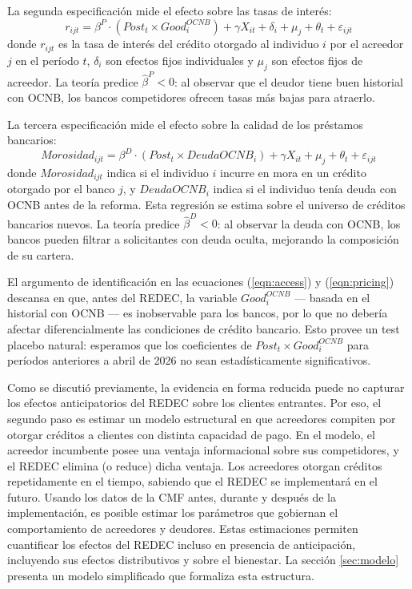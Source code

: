 \documentclass[11pt]{article}
\theoremstyle{plain}
\theoremstyle{plain}
\begin{document}
La segunda especificación mide el efecto sobre las tasas de interés:
\begin{equation}
    r_{ijt} = \beta^P \cdot (Post_t \times Good_i^{OCNB}) + \gamma X_{it} + \delta_i + \mu_j + \theta_t + \varepsilon_{ijt}
    \label{eqn:pricing}
\end{equation}
donde $r_{ijt}$ es la tasa de interés del crédito otorgado al individuo $i$ por el acreedor $j$ en el período $t$, $\delta_i$ son efectos fijos individuales y $\mu_j$ son efectos fijos de acreedor. La teoría predice $\hat{\beta}^P < 0$: al observar que el deudor tiene buen historial con OCNB, los bancos competidores ofrecen tasas más bajas para atraerlo.

La tercera especificación mide el efecto sobre la calidad de los préstamos bancarios:
\begin{equation}
    Morosidad_{ijt} = \beta^D \cdot (Post_t \times DeudaOCNB_i) + \gamma X_{it} + \mu_j + \theta_t + \varepsilon_{ijt}
    \label{eqn:delinquency}
\end{equation}
donde $Morosidad_{ijt}$ indica si el individuo $i$ incurre en mora en un crédito otorgado por el banco $j$, y $DeudaOCNB_i$ indica si el individuo tenía deuda con OCNB antes de la reforma. Esta regresión se estima sobre el universo de créditos bancarios nuevos. La teoría predice $\hat{\beta}^D < 0$: al observar la deuda con OCNB, los bancos pueden filtrar a solicitantes con deuda oculta, mejorando la composición de su cartera.

El argumento de identificación en las ecuaciones (\ref{eqn:access}) y (\ref{eqn:pricing}) descansa en que, antes del REDEC, la variable $Good_i^{OCNB}$ --- basada en el historial con OCNB --- es inobservable para los bancos, por lo que no debería afectar diferencialmente las condiciones de crédito bancario. Esto provee un test placebo natural: esperamos que los coeficientes de $Post_t \times Good_i^{OCNB}$ para períodos anteriores a abril de 2026 no sean estadísticamente significativos.

Como se discutió previamente, la evidencia en forma reducida puede no capturar los efectos anticipatorios del REDEC sobre los clientes entrantes. Por eso, el segundo paso es estimar un modelo estructural en que acreedores compiten por otorgar créditos a clientes con distinta capacidad de pago. En el modelo, el acreedor incumbente posee una ventaja informacional sobre sus competidores, y el REDEC elimina (o reduce) dicha ventaja. Los acreedores otorgan créditos repetidamente en el tiempo, sabiendo que el REDEC se implementará en el futuro. Usando los datos de la CMF antes, durante y después de la implementación, es posible estimar los parámetros que gobiernan el comportamiento de acreedores y deudores. Estas estimaciones permiten cuantificar los efectos del REDEC incluso en presencia de anticipación, incluyendo sus efectos distributivos y sobre el bienestar. La sección \ref{sec:modelo} presenta un modelo simplificado que formaliza esta estructura.
\end{document}
